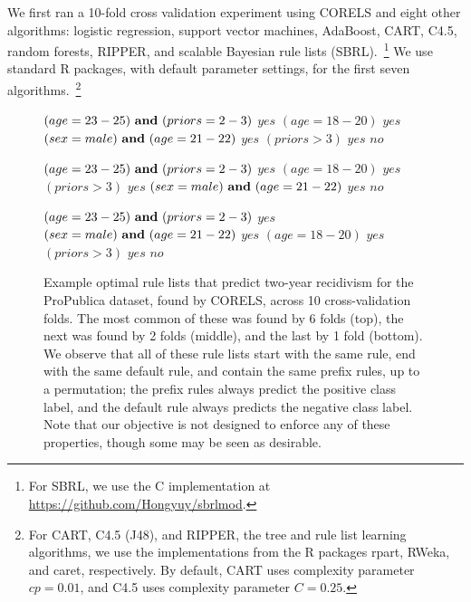 We first ran a 10-fold cross validation experiment using CORELS
and eight other algorithms:
logistic regression, support vector machines, AdaBoost, CART, C4.5,
random forests, RIPPER, and scalable Bayesian rule lists (SBRL).~\footnote{For
SBRL, we use the C implementation at \url{https://github.com/Hongyuy/sbrlmod}.}
%
We use standard R packages, with default parameter settings,
for the first seven algorithms.~\footnote{For CART, C4.5 (J48), and RIPPER,
\ie the tree and rule list learning algorithms, we use the implementations
from the R packages rpart, RWeka, and caret, respectively.
%
By default, CART uses complexity parameter ${cp = 0.01}$,
and C4.5 uses complexity parameter ${C = 0.25}$.
}

\begin{figure}[t]
\begin{algorithmic}
\State \bif $(age = 23-25) {\bf ~and~} (priors = 2-3)$ \bthen $yes$
\State \belif $(age = 18-20)$ \bthen $yes$
\State \belif $(sex = male) {\bf ~and~} (age = 21-22)$ \bthen $yes$
\State \belif $(priors > 3)$ \bthen $yes$
\State \belse $no$
\end{algorithmic}
\vspace{1mm}
\begin{algorithmic}
\State \bif $(age = 23-25) {\bf ~and~} (priors = 2-3)$ \bthen $yes$
\State \belif $(age = 18-20)$ \bthen $yes$
\State \belif $(priors > 3)$ \bthen $yes$
\State \belif $(sex = male) {\bf ~and~} (age = 21-22)$ \bthen $yes$
\State \belse $no$
\end{algorithmic}
\vspace{1mm}
\begin{algorithmic}
\State \bif $(age = 23-25) {\bf ~and~} (priors = 2-3)$ \bthen $yes$
\State \belif $(sex = male) {\bf ~and~} (age = 21-22)$ \bthen $yes$
\State \belif $(age = 18-20)$ \bthen $yes$
\State \belif $(priors > 3)$ \bthen $yes$
\State \belse $no$
\end{algorithmic}
\caption{Example optimal rule lists that predict two-year recidivism for the
ProPublica dataset, found by CORELS, across 10 cross-validation folds.
%
The most common of these was found by 6 folds (top),
the next was found by 2 folds (middle), and the last by 1 fold (bottom).
%
We observe that all of these rule lists start with the same rule,
end with the same default rule, and contain the same prefix rules, up to a permutation;
the prefix rules always predict the positive class label,
and the default rule always predicts the negative class label.
%
Note that our objective is not designed to enforce any of these properties,
though some may be seen as desirable.
}
\label{fig:recidivism-all-folds}
\end{figure}

